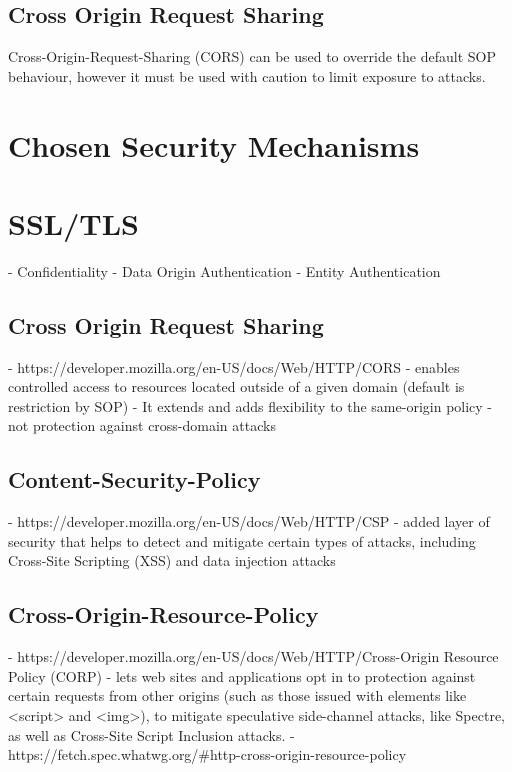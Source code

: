 \documentclass{mscreport}
\begin{document}
\subsection{Cross Origin Request Sharing}
\label{section:Cross-Origin-Request-Sharing}
Cross-Origin-Request-Sharing (CORS) can be used to override the default SOP behaviour, however it must be used with caution to limit exposure to attacks.

\section{Chosen Security Mechanisms}


\section{SSL/TLS}
- Confidentiality
- Data Origin Authentication
- Entity Authentication

\subsection{Cross Origin Request Sharing}
- https://developer.mozilla.org/en-US/docs/Web/HTTP/CORS
- enables controlled access to resources located outside of a given domain (default is restriction by SOP)
- It extends and adds flexibility to the same-origin policy
- not protection against cross-domain attacks

\subsection{Content-Security-Policy}
- https://developer.mozilla.org/en-US/docs/Web/HTTP/CSP
- added layer of security that helps to detect and mitigate certain types of attacks, including Cross-Site Scripting (XSS) and data injection attacks


\subsection{Cross-Origin-Resource-Policy}
- https://developer.mozilla.org/en-US/docs/Web/HTTP/Cross-Origin Resource Policy (CORP)
- lets web sites and applications opt in to protection against certain requests from other origins (such as those issued with elements like <script> and <img>), to mitigate speculative side-channel attacks, like Spectre, as well as Cross-Site Script Inclusion attacks.
- https://fetch.spec.whatwg.org/\#http-cross-origin-resource-policy
\end{document}
